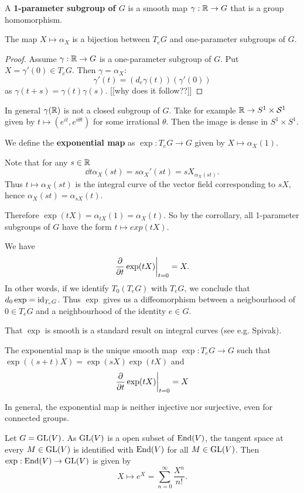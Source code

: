\documentclass[11pt, english]{article}
\begin{document}
A \textbf{1-parameter subgroup of $G$} is a smooth map $\gamma:\mathbb{R} \to G$ that is a group homomorphism.

\begin{corr}
 The map $X \mapsto \alpha_X$ is a bijection between $T_eG$ and one-parameter subgroups of $G$.
\end{corr}
\begin{proof}
 Assume $\gamma:\mathbb{R} \to G$ is a one-parameter subgroup of $G$. Put $X = \gamma'(0) \in T_eG$. Then $\gamma = \alpha_X$:
$$
\gamma'(t) = (d_e \gamma(t))(\gamma'(0))
$$
as $\gamma(t+s)=\gamma(t)\gamma(s)$. [[why does it follow??]]
\end{proof}

\begin{remark}
 In general $\gamma(\mathbb{R})$ is not a closed subgroup of $G$. Take for example $\mathbb{R} \to S^1 \times \mathcal{S}^1$ given by $t \mapsto (e^{it},e^{i\theta t})$ for some irrational $\theta$. Then the image is dense in $S^1 \times S^1$.
\end{remark}

We define the \textbf{exponential map} as $\exp:T_e G \to G$ given by $X \mapsto \alpha_X(1)$. 

Note that for any $s \in \mathbb{R}$
$$
\dd{}{t} \alpha_X (st) = s \alpha_X'(st) = s X_{\alpha_X(st)}.
$$
Thus $t \mapsto \alpha_X(st)$ is the integral curve of the vector field corresponding to $sX$, hence $\alpha_X(st)= \alpha_{sX}(t)$. 

Therefore $\exp(tX)=\alpha_{tX}(1) = \alpha_X(t)$. So by the corrollary, all 1-parameter subgroups of $G$ have the form $t \mapsto exp(tX)$. 

We have
$$
\restr{\dd{}{t} \exp(tX)}{t=0} = X.
$$
In other words, if we identify $T_0(T_eG)$ with $T_eG$, we conclude that $d_0 \exp = \text{id}_{T_eG}$. Thus $\exp$ gives us a diffeomorphism between a neigbourhood of $0 \in T_eG$ and a neighbourhood of the identity $e \in G$.

That $\exp$ is smooth is a standard result on integral curves (see e.g. Spivak).

\begin{thm}
  The exponential map is the unique smooth map $\exp:T_eG \to G$ such that $\exp((s+t)X) = \exp(sX)\exp(tX)$ and
$$
\restr{\dd{}{t} \exp(tX)}{t=0}=X
$$
\end{thm}
In general, the exponential map is neither injective nor surjective, even for connected groups.
\begin{example}
Let $G = \operatorname{GL}(V)$. As $\operatorname{GL}(V)$ is a open subset of $\operatorname{End}(V)$, the tangent space at every $M \in \operatorname{GL}(V)$ is identified with $\operatorname{End}(V)$ for all $M \in \operatorname{GL}(V)$. Then $\exp:\operatorname{End}(V) \to \operatorname{GL}(V)$ is given by 
$$
X \mapsto e^X = \sum_{n=0}^\infty \frac{X^n}{n!}.
$$
\end{example}
\end{document}
